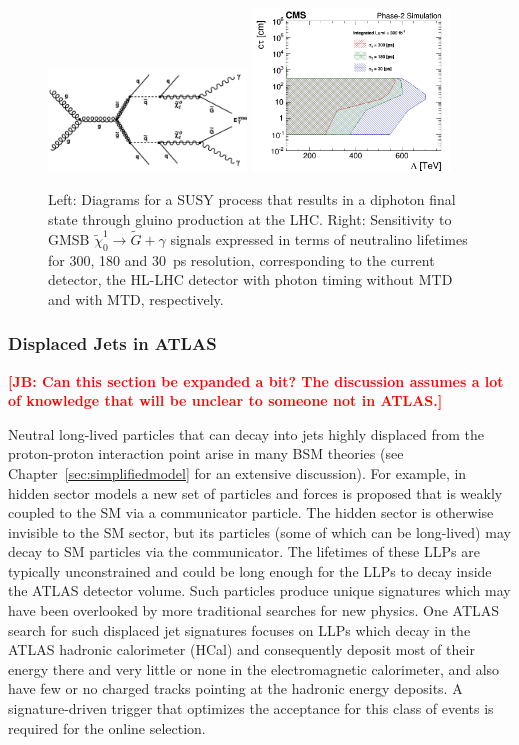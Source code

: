 \begin{figure}[t]\begin{center}
\includegraphics[width=0.47\textwidth]{figures/MTD/diagram.png}
\includegraphics[width=0.47\textwidth]{figures/MTD/Limits_excl_2D_ComparingRes.png}
\caption{ 
Left: Diagrams for a SUSY process that results in a diphoton final state through gluino production at the LHC. Right: Sensitivity to GMSB $\tilde{\chi}_0^1 \to \tilde{G} + \gamma$ signals expressed in terms of neutralino lifetimes for 300, 180 and 30~ps resolution, corresponding to the current detector, the HL-LHC detector with photon timing without MTD and with MTD, respectively.
}
\label{fig:cmsupgrade_photon}
\end{center}
\end{figure}

\subsubsection{Displaced Jets in ATLAS}

{\bf \textcolor{red}{[JB: Can this section be expanded a bit?  The discussion assumes a lot of knowledge that will be unclear to someone not in ATLAS.]}}

Neutral long-lived particles that can decay into jets highly displaced from the proton-proton interaction point arise in many BSM theories (see Chapter~\ref{sec:simplifiedmodel} for an extensive discussion). For example, in hidden sector models a new set of particles and forces is proposed that is weakly coupled to the SM via a communicator particle. The hidden sector is otherwise invisible to the SM sector, but its particles (some of which can be long-lived) may decay to SM particles via the communicator. The lifetimes of these LLPs are typically unconstrained and could be long enough for the LLPs to decay inside the ATLAS detector volume. Such particles produce unique signatures which may have been overlooked by more traditional searches for new physics. One ATLAS search for such displaced jet signatures focuses on LLPs which decay in the ATLAS hadronic calorimeter (HCal) and consequently deposit most of their energy there and very little or none in the electromagnetic calorimeter, and also have few or no charged tracks pointing at the hadronic energy deposits. A signature-driven trigger that optimizes the acceptance for this class of events is required for the online selection. 

